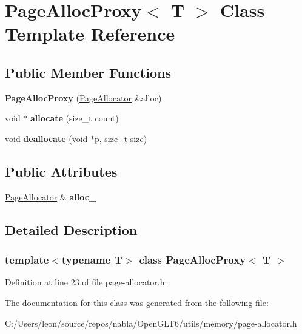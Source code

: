 \hypertarget{class_page_alloc_proxy}{}\section{Page\+Alloc\+Proxy$<$ T $>$ Class Template Reference}
\label{class_page_alloc_proxy}
\subsection*{Public Member Functions}
\begin{DoxyCompactItemize}
\item 
\mbox{\label{class_page_alloc_proxy_a87bd2d2c09dca3fb6e3d2dc64199624a}} 
{\bfseries Page\+Alloc\+Proxy} (\mbox{\hyperlink{class_page_allocator}{Page\+Allocator}} \&alloc)
\item 
\mbox{\label{class_page_alloc_proxy_a6eb35c0d191b75c7448c1dbe722f1241}} 
void $\ast$ {\bfseries allocate} (size\+\_\+t count)
\item 
\mbox{\label{class_page_alloc_proxy_aae141951053a3d3a4288b9a8cd548514}} 
void {\bfseries deallocate} (void $\ast$p, size\+\_\+t size)
\end{DoxyCompactItemize}
\subsection*{Public Attributes}
\begin{DoxyCompactItemize}
\item 
\mbox{\label{class_page_alloc_proxy_a7b5be1918abad6ffc2cc6f88b1dec98c}} 
\mbox{\hyperlink{class_page_allocator}{Page\+Allocator}} \& {\bfseries alloc\+\_\+}
\end{DoxyCompactItemize}


\subsection{Detailed Description}
\subsubsection*{template$<$typename T$>$\newline
class Page\+Alloc\+Proxy$<$ T $>$}



Definition at line 23 of file page-\/allocator.\+h.



The documentation for this class was generated from the following file\+:\begin{DoxyCompactItemize}
\item 
C\+:/\+Users/leon/source/repos/nabla/\+Open\+G\+L\+T6/utils/memory/page-\/allocator.\+h\end{DoxyCompactItemize}
